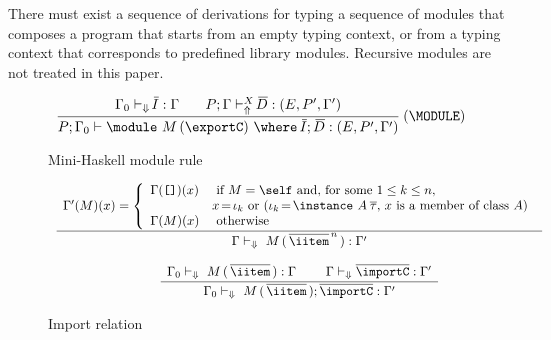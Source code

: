 There must exist a sequence of derivations for typing a sequence of
modules that composes a program that starts from an empty typing
context, or from a typing context that corresponds to predefined
library modules. Recursive modules are not treated in this paper.

\begin{figure}
\begin{mdframed}
\[ \begin{array}{cc}
	\displaystyle\frac
	 {\begin{array}{ll}
           \Gamma_0 \vdash_{\Downarrow} \overline{\!I} : \Gamma\:\: & \:\:P;\Gamma \vdash_{\Uparrow}^X \overline{\!D} : (E,P',\Gamma') 
          \end{array}}
	 {P;\Gamma_0 \vdash \module\ M\, (\exportC)\ \where\ \overline{\!I};\, \overline{\!D} : (E,P',\Gamma')} \:(\MODULE)
\end{array} \]
\end{mdframed} \vspace{-.2cm}
\caption{Mini-Haskell module rule} 
\label{fig:mini-haskell-module-rule}
\end{figure}

\begin{figure}
\begin{mdframed}
\[ \begin{array}{cc}
	\displaystyle\frac
	 {\begin{array}{ll}
            \Gamma'(M)(x) = \left\{ \begin{array}{ll}
              \Gamma(\texttt{[]})(x) & \text{ if } M = \self \text{ and, for some $1 \leq k \leq n$, }\\
                                     & %
                                         x\hspace*{-.05cm} =\hspace*{-.05cm} \iota_k \text{ or 
                                         ($\iota_k\hspace*{-.05cm} =\hspace*{-.05cm} \instance\ A\: \overline{\tau}$, $x$ is a member of class $A$)}\\
               \Gamma(M)(x)          & \text{ otherwise}
             \end{array}\right.
          \end{array}}
	 {\Gamma \vdash_{\Downarrow} \ M\, (\,\overline{\iitem}^{\,n}\,) : \Gamma'}  \\\ \\

	\displaystyle\frac
	 {\begin{array}{ll}
	   \Gamma_0 \vdash_{\Downarrow} \ M\, (\,\overline{\iitem}\,) : \Gamma \:\:\: & \:\:\: 
           \Gamma \vdash_{\Downarrow} \overline{\importC} : \Gamma'
          \end{array}}
	 {\Gamma_0 \vdash_{\Downarrow} \ M\, (\,\overline{\iitem}\,); \overline{\importC} : \Gamma'} 
\end{array} \]
\end{mdframed} \vspace{-.2cm}
\caption{Import relation}
\label{fig:import-relation}
\end{figure}

